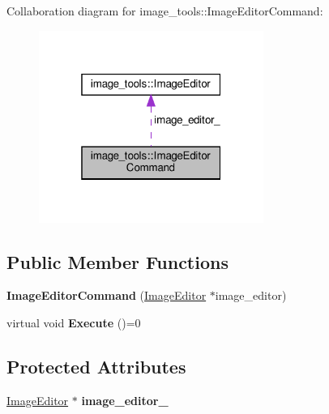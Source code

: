 Collaboration diagram for image\+\_\+tools\+:\+:Image\+Editor\+Command\+:
\nopagebreak
\begin{figure}[H]
\begin{center}
\leavevmode
\includegraphics[width=208pt]{classimage__tools_1_1ImageEditorCommand__coll__graph}
\end{center}
\end{figure}
\subsection*{Public Member Functions}
\begin{DoxyCompactItemize}
\item 
\mbox{\label{classimage__tools_1_1ImageEditorCommand_ac2843ecf9bcbae0dcb88b0eb081612e6}} 
{\bfseries Image\+Editor\+Command} (\hyperlink{classimage__tools_1_1ImageEditor}{Image\+Editor} $\ast$image\+\_\+editor)
\item 
\mbox{\label{classimage__tools_1_1ImageEditorCommand_aed20aa0ff8ae87c92c35ec2d445ffe96}} 
virtual void {\bfseries Execute} ()=0
\end{DoxyCompactItemize}
\subsection*{Protected Attributes}
\begin{DoxyCompactItemize}
\item 
\mbox{\label{classimage__tools_1_1ImageEditorCommand_a2b973bf000632c7767a29ca979dd3ef8}} 
\hyperlink{classimage__tools_1_1ImageEditor}{Image\+Editor} $\ast$ {\bfseries image\+\_\+editor\+\_\+}
\end{DoxyCompactItemize}


